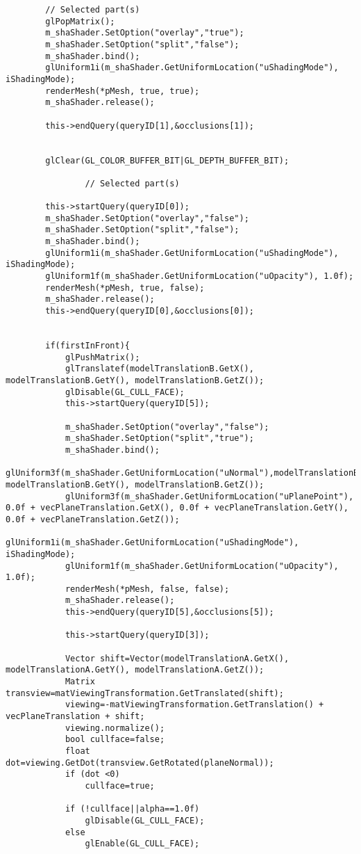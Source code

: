 \begin{verbatim}
		// Selected part(s)
		glPopMatrix();
		m_shaShader.SetOption("overlay","true");
		m_shaShader.SetOption("split","false");
		m_shaShader.bind();
		glUniform1i(m_shaShader.GetUniformLocation("uShadingMode"), iShadingMode);
		renderMesh(*pMesh, true, true);
		m_shaShader.release();

		this->endQuery(queryID[1],&occlusions[1]);


		glClear(GL_COLOR_BUFFER_BIT|GL_DEPTH_BUFFER_BIT);

				// Selected part(s)
		
		this->startQuery(queryID[0]);
		m_shaShader.SetOption("overlay","false");
		m_shaShader.SetOption("split","false");
		m_shaShader.bind();
		glUniform1i(m_shaShader.GetUniformLocation("uShadingMode"), iShadingMode);
		glUniform1f(m_shaShader.GetUniformLocation("uOpacity"), 1.0f);
		renderMesh(*pMesh, true, false);
		m_shaShader.release();
		this->endQuery(queryID[0],&occlusions[0]);
		
		
		if(firstInFront){
			glPushMatrix();
			glTranslatef(modelTranslationB.GetX(), modelTranslationB.GetY(), modelTranslationB.GetZ());
			glDisable(GL_CULL_FACE);
			this->startQuery(queryID[5]);

			m_shaShader.SetOption("overlay","false");
			m_shaShader.SetOption("split","true");
			m_shaShader.bind();
			glUniform3f(m_shaShader.GetUniformLocation("uNormal"),modelTranslationB.GetX(), modelTranslationB.GetY(), modelTranslationB.GetZ());
			glUniform3f(m_shaShader.GetUniformLocation("uPlanePoint"), 0.0f + vecPlaneTranslation.GetX(), 0.0f + vecPlaneTranslation.GetY(), 0.0f + vecPlaneTranslation.GetZ());
			glUniform1i(m_shaShader.GetUniformLocation("uShadingMode"), iShadingMode);
			glUniform1f(m_shaShader.GetUniformLocation("uOpacity"), 1.0f);
			renderMesh(*pMesh, false, false);
			m_shaShader.release();
			this->endQuery(queryID[5],&occlusions[5]);
			
			this->startQuery(queryID[3]);
			
			Vector shift=Vector(modelTranslationA.GetX(), modelTranslationA.GetY(), modelTranslationA.GetZ());
			Matrix transview=matViewingTransformation.GetTranslated(shift);
			viewing=-matViewingTransformation.GetTranslation() + vecPlaneTranslation + shift;
			viewing.normalize();
			bool cullface=false;
			float dot=viewing.GetDot(transview.GetRotated(planeNormal));
			if (dot <0)
				cullface=true;

			if (!cullface||alpha==1.0f)
				glDisable(GL_CULL_FACE);
			else
				glEnable(GL_CULL_FACE);	


\end{verbatim}
